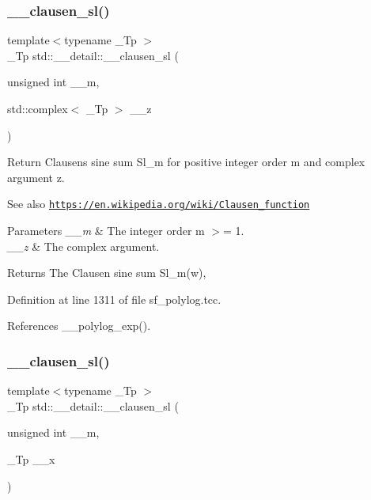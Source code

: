 \subsubsection{\texorpdfstring{\+\_\+\+\_\+clausen\+\_\+sl()}{\_\_clausen\_sl()}\hspace{0.1cm}{\footnotesize\ttfamily [1/2]}}
{\footnotesize\ttfamily template$<$typename \+\_\+\+Tp $>$ \\
\+\_\+\+Tp std\+::\+\_\+\+\_\+detail\+::\+\_\+\+\_\+clausen\+\_\+sl (\begin{DoxyParamCaption}\item[{unsigned int}]{\+\_\+\+\_\+m,  }\item[{std\+::complex$<$ \+\_\+\+Tp $>$}]{\+\_\+\+\_\+z }\end{DoxyParamCaption})}

Return Clausen\textquotesingle{}s sine sum Sl\+\_\+m for positive integer order m and complex argument z. \begin{DoxySeeAlso}{See also}
\href{https://en.wikipedia.org/wiki/Clausen_function}{\tt https\+://en.\+wikipedia.\+org/wiki/\+Clausen\+\_\+function}
\end{DoxySeeAlso}

\begin{DoxyParams}{Parameters}
{\em \+\_\+\+\_\+m} & The integer order m $>$= 1. \\
\hline
{\em \+\_\+\+\_\+z} & The complex argument. \\
\hline
\end{DoxyParams}
\begin{DoxyReturn}{Returns}
The Clausen sine sum Sl\+\_\+m(w), 
\end{DoxyReturn}


Definition at line 1311 of file sf\+\_\+polylog.\+tcc.



References \+\_\+\+\_\+polylog\+\_\+exp().

\mbox{\label{namespacestd_1_1____detail_a554bb352d6397ea5991400eb3734165f}} 
\subsubsection{\texorpdfstring{\+\_\+\+\_\+clausen\+\_\+sl()}{\_\_clausen\_sl()}\hspace{0.1cm}{\footnotesize\ttfamily [2/2]}}
{\footnotesize\ttfamily template$<$typename \+\_\+\+Tp $>$ \\
\+\_\+\+Tp std\+::\+\_\+\+\_\+detail\+::\+\_\+\+\_\+clausen\+\_\+sl (\begin{DoxyParamCaption}\item[{unsigned int}]{\+\_\+\+\_\+m,  }\item[{\+\_\+\+Tp}]{\+\_\+\+\_\+x }\end{DoxyParamCaption})}

